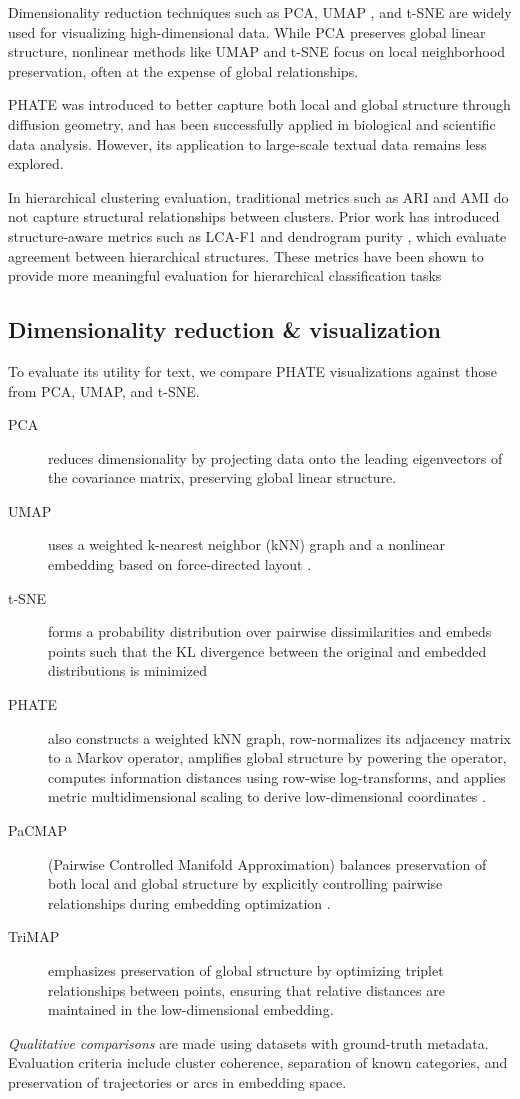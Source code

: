 Dimensionality reduction techniques such as PCA, UMAP \cite{mcinnes2018umap}, and t-SNE \cite{van2008visualizing} are widely used for visualizing high-dimensional data. While PCA preserves global linear structure, nonlinear methods like UMAP and t-SNE focus on local neighborhood preservation, often at the expense of global relationships.

PHATE \cite{moon2019visualizing} was introduced to better capture both local and global structure through diffusion geometry, and has been successfully applied in biological and scientific data analysis. However, its application to large-scale textual data remains less explored.

In hierarchical clustering evaluation, traditional metrics such as ARI and AMI do not capture structural relationships between clusters. Prior work has introduced structure-aware metrics such as LCA-F1 \cite{kosmopoulos2015} and dendrogram purity \cite{heller2005bayesian}, which evaluate agreement between hierarchical structures. These metrics have been shown to provide more meaningful evaluation for hierarchical classification tasks \cite{kosmopoulos2015}

\subsection{Dimensionality reduction \& visualization}
To evaluate its utility for text, we compare PHATE visualizations against those from PCA, UMAP, and t-SNE.
\begin{description}
    \item[PCA] reduces dimensionality by projecting data onto the leading eigenvectors of the covariance matrix, preserving global linear structure.
    \item[UMAP] uses a weighted k-nearest neighbor (kNN) graph and a nonlinear embedding based on force-directed layout \cite{mcinnes2018umap}.
    \item[t-SNE] forms a probability distribution over pairwise dissimilarities and embeds points such that the KL divergence between the original and embedded distributions is minimized \cite{van2008visualizing}
    \item[PHATE] also constructs a weighted kNN graph, row-normalizes its adjacency matrix to a Markov operator, amplifies global structure by powering the operator, computes information distances using row-wise log-transforms, and applies metric multidimensional scaling to derive low-dimensional coordinates \cite{moon2019visualizing}.
    \item[PaCMAP] (Pairwise Controlled Manifold Approximation) balances preservation of both local and global structure by explicitly controlling pairwise relationships during embedding optimization \cite{wang2021pacmap}.
    \item[TriMAP] emphasizes preservation of global structure by optimizing triplet relationships between points, ensuring that relative distances are maintained in the low-dimensional embedding.
\end{description}
\textit{Qualitative comparisons} are made using datasets with ground-truth metadata. Evaluation criteria include cluster coherence, separation of known categories, and preservation of trajectories or arcs in embedding space.
